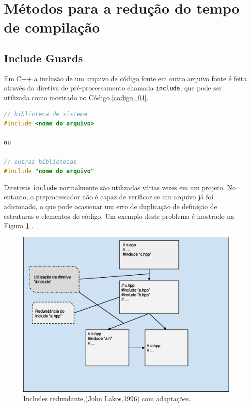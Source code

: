 \section{Métodos para a redução do tempo de compilação}

\subsection{Include Guards}\label{include_guards_section}

Em C++ a inclusão de um arquivo de código fonte em outro arquivo fonte é feita
 através da diretiva de pré-processamento chamada \texttt{include}, que pode 
ser utilizada como mostrado no Código \ref{codigo_04}. 

\begin{lstlisting}[language=C++,caption={Diretiva de 
                           preprocessamento para inclusão de arquivo},
                                                   label=codigo_04]
// biblioteca de sistema 
#include <nome do arquivo>  

ou

// outras bibliotecas 
#include "nome do arquivo"  

\end{lstlisting}


Diretivas \texttt{include} normalmente são utilizadas várias vezes em um projeto.
 No entanto, o preprocessador não é capaz de verificar se um arquivo já foi
 adicionado, o que pode ocasionar um erro de duplicação de definição de
 estruturas e elementos do código. Um exemplo deste problema é mostrado na
 Figura \ref{fig07} \cite{ref41}.

\begin{figure}[h]
    \centering
    \caption{Includes redundante,(John Lakos,1996) com adaptações.}
    \label{fig07}
        \includegraphics[keepaspectratio=true,scale=0.55]{figuras/multi_include.eps}
\end{figure}

